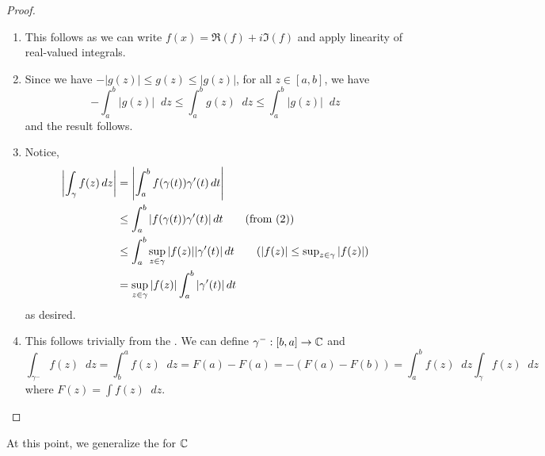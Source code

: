 \documentclass[11pt]{article}
\newcommand*\dif{\mathop{}\!d}
\begin{document}
\begin{proof}\leavevmode
\begin{enumerate}
\item This follows as we can write $f(x) = \Re(f) + i\Im(f)$ and apply linearity
of real-valued integrals.
\item Since we have $-|g(z)| \leq g(z) \leq |g(z)|$, for all $z \in [a,b]$, we
have
\begin{equation*}
-\int_a^b |g(z)| \dif z \leq \int_a^b g(z) \dif z \leq \int_a^b |g(z)| \dif z
\end{equation*}
and the result follows.
\item Notice,
\begin{align*}
\left| \int_\gamma f(z) \dif z\right|
&= \left| \int_a^b f(\gamma(t))\gamma'(t)\dif t\right|\\
&\leq \int_a^b |f(\gamma(t))\gamma'(t)| \dif t \tag{from (2)}\\
&\leq \int_a^b \sup_{z\in\gamma} |f(z)| |\gamma'(t)| \dif t \tag{$|f(z)|\leq
\sup_{z\in\gamma}|f(z)|$}\\
&= \sup_{z\in\gamma} |f(z)| \int_a^b |\gamma'(t)| \dif t 
\end{align*}
as desired.
\item This follows trivially from the . We can
define $\gamma^-:[b,a] \to \mathbb{C}$ and
\begin{equation*}
\int_{\gamma^-} f(z) \dif z
= \int_b^a f(z) \dif z
= F(a) - F(a)
= -(F(a) - F(b))
= \int_a^b f(z) \dif z
\int_{\gamma} f(z) \dif z
\end{equation*}
where $F(z) = \int f(z) \dif z$.
\end{enumerate}
\end{proof}
At this point, we generalize the  for $\mathbb{C}$
\end{document}
